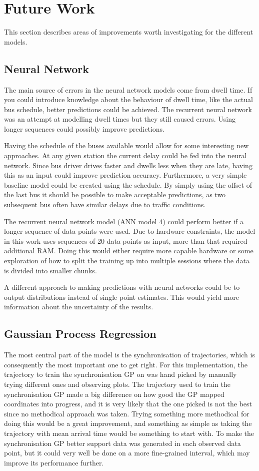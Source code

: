 \section{Future Work}
\label{sec:future-work}
This section describes areas of improvements worth investigating for the different models.

\subsection{Neural Network}
The main source of errors in the neural network models come from dwell time. If you could introduce knowledge about the behaviour of dwell time, like the actual bus schedule, better predictions could be achieved. The recurrent neural network was an attempt at modelling dwell times but they still caused errors. Using longer sequences could possibly improve predictions.

Having the schedule of the buses available would allow for some interesting new approaches. At any given station the current delay could be fed into the neural network. Since bus driver drives faster and dwells less when they are late, having this as an input could improve prediction accuracy. Furthermore, a very simple baseline model could be created using the schedule. By simply using the offset of the last bus it should be possible to make acceptable predictions, as two subsequent bus often have similar delays due to traffic conditions.

The recurrent neural network model (ANN model 4) could perform better if a longer sequence of data points were used. Due to hardware constraints, the model in this work uses sequences of 20 data points as input, more than that required additional RAM. Doing this would either require more capable hardware or some exploration of how to split the training up into multiple sessions where the data is divided into smaller chunks.

A different approach to making predictions with neural networks could be to output distributions instead of single point estimates. This would yield more information about the uncertainty of the results.

\subsection{Gaussian Process Regression}
The most central part of the model is the synchronisation of trajectories, which is consequently the most important one to get right. For this implementation, the trajectory to train the synchronisation GP on was hand picked by manually trying different ones and observing plots. The trajectory used to train the synchronisation GP made a big difference on how good the GP mapped coordinates into progress, and it is very likely that the one picked is not the best since no methodical approach was taken. Trying something more methodical for doing this would be a great improvement, and something as simple as taking the trajectory with mean arrival time would be something to start with. To make the synchronisation GP better support data was generated in each observed data point, but it could very well be done on a more fine-grained interval, which may improve its performance further.

